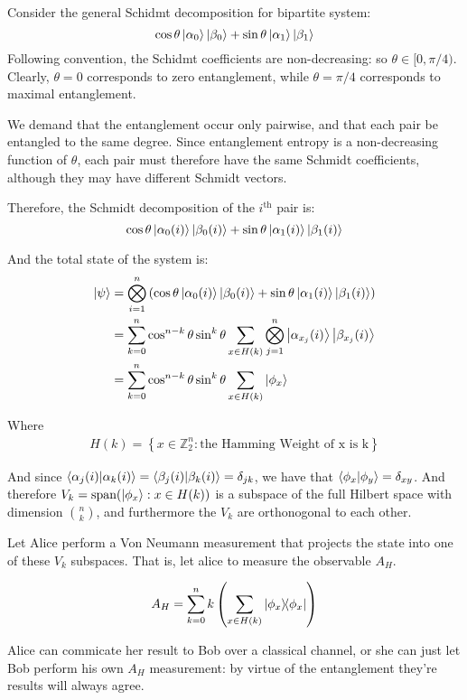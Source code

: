 \newcommand{\ZZ}{\mathbb{Z}} %
\newcommand{\vspan}{\text{span}} %



Consider the general Schidmt decomposition for bipartite system:
$$
\cos\theta \ket{\alpha_0} \ket{\beta_0} + 
\sin\theta \ket{\alpha_1} \ket{\beta_1}
$$
Following convention, the Schidmt coefficients are non-decreasing: so $\theta \in [0, \pi/4)$. Clearly, $\theta = 0$ corresponds to zero entanglement, while $\theta = \pi/4$ corresponds to maximal entanglement.


We demand that the entanglement occur only pairwise, and that each pair be entangled to the same degree. Since entanglement entropy is a non-decreasing function of $\theta$, each pair must therefore have the same Schmidt coefficients, although they may have different Schmidt vectors. 

Therefore, the Schmidt decomposition of the $i^{\text{th}}$ pair is:  
$$
\cos\theta \ket{\alpha_0(i)} \ket{\beta_0(i)} + 
\sin\theta \ket{\alpha_1(i)} \ket{\beta_1(i)}
$$

And the total state of the system is:
\begin{align}
	\ket{\psi} &= \bigotimes_{i=1}^n \left( 
	\cos\theta \ket{\alpha_0(i)} \ket{\beta_0(i)} + 
	\sin\theta \ket{\alpha_1(i)} \ket{\beta_1(i)} \right) \\
	&= \sum_{k=0}^n \cos^{n-k}\theta \sin^k\theta
	\sum_{x \in H(k)} \bigotimes_{j=1}^n 
	\ket{\alpha_{x_j}(i)} \ket{\beta_{x_j}(i)} \\
	&=  \sum_{k=0}^n \cos^{n-k}\theta \sin^k\theta
	\sum_{x \in H(k)} \ket{\phi_x}
\end{align}

Where 
\begin{align}
	H(k) = \left\{ x \in \ZZ_2^n : \text{the Hamming Weight of x is k}
	\right\}
\end{align}

And since $ \braket{\alpha_j(i)}{\alpha_k(i)} = \braket{\beta_j(i)}{\beta_k(i)} = \delta_{jk} $, we have that $\braket{\phi_x}{\phi_y} = \delta_{xy}$. And therefore $V_k = \vspan(\ket{\phi_x} : x \in H(k))$ is a subspace of the full Hilbert space with dimension $\binom{n}{k}$, and furthermore the $V_k$ are orthonogonal to each other.

Let Alice perform a Von Neumann measurement that projects the state into one of these $V_k$ subspaces. That is, let alice to measure the observable $A_H$.

\begin{align}
	A_H = \sum_{k=0}^n k \left( \sum_{x \in H(k)}  \dyad{\phi_x}{\phi_x} \right) 
\end{align}

Alice can commicate her result to Bob over a classical channel, or she can just let Bob perform his own $A_H$ measurement: by virtue of the entanglement they're results will always agree.